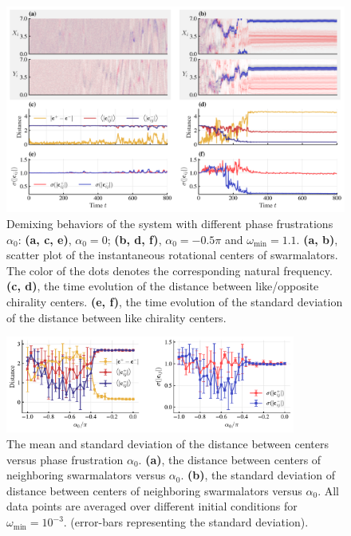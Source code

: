 \documentclass{article}
\begin{document}
\begin{figure}
    \includegraphics[width=\textwidth]{./figs/centersScatterXY.png}
    \caption{
        \label{fig:centersScatterXY} 
        Demixing behaviors of the system with different phase frustrations $\alpha_0$: \textbf{(a, c, e)}, $\alpha_0=0$; \textbf{(b, d, f)}, $\alpha_0=-0.5\pi$ and $\omega_{\min}=1.1$.
        \textbf{(a, b)}, scatter plot of the instantaneous rotational centers of swarmalators. The color of the dots denotes the corresponding natural frequency.
        \textbf{(c, d)}, the time evolution of the distance between like/opposite chirality centers.
        \textbf{(e, f)}, the time evolution of the standard deviation of the distance between like chirality centers. 
    }
\end{figure}

\begin{figure}
    \includegraphics[width=0.85\textwidth]{./figs/distancesVsAlpha.pdf}
    \caption{
        \label{fig:distancesVsAlpha} 
        The mean and standard deviation of the distance between centers versus phase frustration $\alpha_0$.
        \textbf{(a)}, the distance between centers of neighboring swarmalators versus $\alpha_0$.
        \textbf{(b)}, the standard deviation of distance between centers of neighboring swarmalators versus $\alpha_0$.
        All data points are averaged over different initial conditions for $\omega_{\min}=10^{-3}$. (error-bars representing the standard deviation).
    }
\end{figure}
\end{document}
